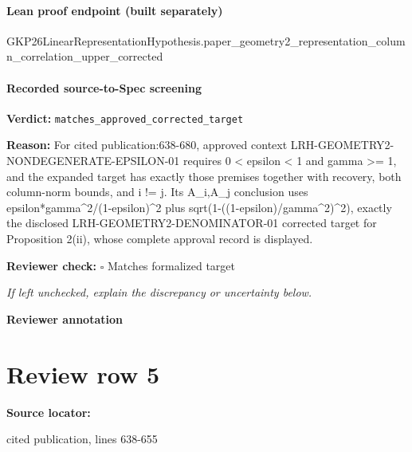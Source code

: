 \documentclass[10pt]{article}
\newcommand{\reviewerbox}{%
  \par\noindent\fbox{\parbox{0.96\linewidth}{\rule{0pt}{0.38in}}}\par
}
\newcommand{\reviewmatch}[1]{%
  \par\noindent\textbf{Reviewer check:} $\square$\; #1\par
  \noindent\emph{If left unchecked, explain the discrepancy or uncertainty below.}\par
}
\begin{document}
\paragraph{Lean proof endpoint (built separately)}\begin{ReviewVerbatim}
GKP26LinearRepresentationHypothesis.paper_geometry2_representation_column_correlation_upper_corrected
\end{ReviewVerbatim}

\paragraph{Recorded source-to-Spec screening}
\textbf{Verdict:} \texttt{matches\_approved\_corrected\_target}
\\
{\raggedright
\textbf{Reason:} For cited publication:\allowbreak{}638-\allowbreak{}680, approved context LRH-\allowbreak{}GEOMETRY2-\allowbreak{}NONDEGENERATE-\allowbreak{}EPSILON-\allowbreak{}01 requires 0 < epsilon < 1 and gamma >= 1, and the expanded target has exactly those premises together with recovery, both column-\allowbreak{}norm bounds, and i != j.\allowbreak{} Its A\_\allowbreak{}i,A\_\allowbreak{}j conclusion uses epsilon*gamma\textasciicircum{}2/\allowbreak{}(1-\allowbreak{}epsilon)\textasciicircum{}2 plus sqrt(1-\allowbreak{}((1-\allowbreak{}epsilon)/\allowbreak{}gamma\textasciicircum{}2)\textasciicircum{}2), exactly the disclosed LRH-\allowbreak{}GEOMETRY2-\allowbreak{}DENOMINATOR-\allowbreak{}01 corrected target for Proposition 2(ii), whose complete approval record is displayed.\allowbreak{}
\par}
\reviewmatch{Matches formalized target}
\noindent\textbf{Reviewer annotation}\par
\reviewerbox
\clearpage
\hypertarget{source-claim-93035163b22de06d}{}
\section*{Review row 5}
\textbf{Source locator:} {\footnotesize\raggedright cited publication, lines 638-\allowbreak{}655\par}
\end{document}
